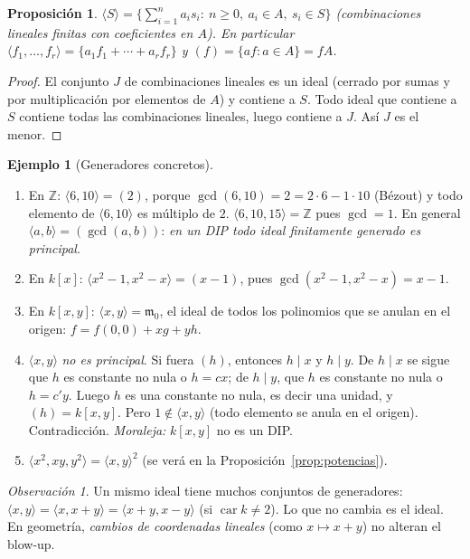 \documentclass[11pt,a4paper]{article}
\newcommand{\ZZ}{\mathbb{Z}}
\newcommand{\mm}{\mathfrak{m}}
\newcommand{\gen}[1]{\langle #1\rangle}
\theoremstyle{plain}
\newtheorem{proposicion}[teorema]{Proposición}
\theoremstyle{definition}
\newtheorem{ejemplo}[teorema]{Ejemplo}
\theoremstyle{remark}
\newtheorem*{obs}{Observación}
\newcounter{ej}
\begin{document}
\begin{proposicion}\label{prop:generado}
$\gen S=\Big\{\sum_{i=1}^na_is_i:\ n\ge0,\ a_i\in A,\ s_i\in S\Big\}$ (combinaciones lineales finitas con coeficientes en $A$). En particular $\gen{f_1,\dots,f_r}=\{a_1f_1+\cdots+a_rf_r\}$ y $(f)=\{af:a\in A\}=fA$.
\end{proposicion}
\begin{proof}
El conjunto $J$ de combinaciones lineales es un ideal (cerrado por sumas y por multiplicación por elementos de $A$) y contiene a $S$. Todo ideal que contiene a $S$ contiene todas las combinaciones lineales, luego contiene a $J$. Así $J$ es el menor.
\end{proof}

\begin{ejemplo}[Generadores concretos]\label{ej:gen}
\begin{enumerate}[label=(\alph*),itemsep=2pt]
\item En $\ZZ$: $\gen{6,10}=(2)$, porque $\gcd(6,10)=2=2\cdot 6-1\cdot 10$ (Bézout) y todo elemento de $\gen{6,10}$ es múltiplo de $2$. $\gen{6,10,15}=\ZZ$ pues $\gcd=1$. En general $\gen{a,b}=(\gcd(a,b))$: \emph{en un DIP todo ideal finitamente generado es principal}.
\item En $k[x]$: $\gen{x^2-1,x^2-x}=(x-1)$, pues $\gcd(x^2-1,x^2-x)=x-1$.
\item En $k[x,y]$: $\gen{x,y}=\mm_0$, el ideal de todos los polinomios que se anulan en el origen: $f=f(0,0)+xg+yh$.
\item $\gen{x,y}$ \emph{no es principal}. Si fuera $(h)$, entonces $h\mid x$ y $h\mid y$. De $h\mid x$ se sigue que $h$ es constante no nula o $h=cx$; de $h\mid y$, que $h$ es constante no nula o $h=c'y$. Luego $h$ es una constante no nula, es decir una unidad, y $(h)=k[x,y]$. Pero $1\notin\gen{x,y}$ (todo elemento se anula en el origen). Contradicción. \emph{Moraleja:} $k[x,y]$ no es un DIP.
\item $\gen{x^2,xy,y^2}=\gen{x,y}^2$ (se verá en la Proposición~\ref{prop:potencias}).
\end{enumerate}
\end{ejemplo}

\begin{obs}
Un mismo ideal tiene muchos conjuntos de generadores: $\gen{x,y}=\gen{x,x+y}=\gen{x+y,x-y}$ (si $\operatorname{car}k\ne2$). Lo que no cambia es el ideal. En geometría, \emph{cambios de coordenadas lineales} (como $x\mapsto x+y$) no alteran el blow-up.
\end{obs}
\end{document}
